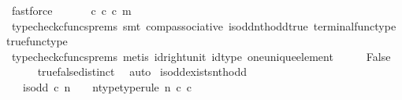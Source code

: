 \begin{isabellebody}
\ fastforce\isanewline
\ \ \isamarkupfalse%
\ \isamarkupfalse%
\ {\isachardoublequoteopen}{\isasymt}\ {\isasymcirc}\isactrlsub c\ {\isasymbeta}\isactrlbsub {\isasymnat}\isactrlsub c\isactrlesub \ {\isasymcirc}\isactrlsub c\ m\ {\isacharequal}{\kern0pt}\ {\isasymf}{\isachardoublequoteclose}\isanewline
\ \ \ \ \isamarkupfalse%
\ {\isacharparenleft}{\kern0pt}typecheck{\isacharunderscore}{\kern0pt}cfuncs{\isacharunderscore}{\kern0pt}prems{\isacharcomma}{\kern0pt}\ smt\ comp{\isacharunderscore}{\kern0pt}associative{}\ is{\isacharunderscore}{\kern0pt}odd{\isacharunderscore}{\kern0pt}nth{\isacharunderscore}{\kern0pt}odd{\isacharunderscore}{\kern0pt}true\ terminal{\isacharunderscore}{\kern0pt}func{\isacharunderscore}{\kern0pt}type\ true{\isacharunderscore}{\kern0pt}func{\isacharunderscore}{\kern0pt}type{\isacharparenright}{\kern0pt}\isanewline
\ \ \isamarkupfalse%
\ \isamarkupfalse%
\ {\isachardoublequoteopen}{\isasymt}\ {\isacharequal}{\kern0pt}\ {\isasymf}{\isachardoublequoteclose}\isanewline
\ \ \ \ \isamarkupfalse%
\ {\isacharparenleft}{\kern0pt}typecheck{\isacharunderscore}{\kern0pt}cfuncs{\isacharunderscore}{\kern0pt}prems{\isacharcomma}{\kern0pt}\ metis\ id{\isacharunderscore}{\kern0pt}right{\isacharunderscore}{\kern0pt}unit{}\ id{\isacharunderscore}{\kern0pt}type\ one{\isacharunderscore}{\kern0pt}unique{\isacharunderscore}{\kern0pt}element{\isacharparenright}{\kern0pt}\isanewline
\ \ \isamarkupfalse%
\ \isamarkupfalse%
\ False\isanewline
\ \ \ \ \isamarkupfalse%
\ true{\isacharunderscore}{\kern0pt}false{\isacharunderscore}{\kern0pt}distinct\ \isamarkupfalse%
\ auto\isanewline
{}\isamarkupfalse%
%
\endisatagproof
{\isafoldproof}%
%
\isadelimproof
\isanewline
%
\endisadelimproof
\isanewline
{}\isamarkupfalse%
\ is{\isacharunderscore}{\kern0pt}odd{\isacharunderscore}{\kern0pt}exists{\isacharunderscore}{\kern0pt}nth{\isacharunderscore}{\kern0pt}odd{\isacharcolon}{\kern0pt}\isanewline
\ \ \ {\isachardoublequoteopen}is{\isacharunderscore}{\kern0pt}odd\ {\isasymcirc}\isactrlsub c\ n\ {\isacharequal}{\kern0pt}\ {\isasymt}{\isachardoublequoteclose}\ \ n{\isacharunderscore}{\kern0pt}type{\isacharbrackleft}{\kern0pt}type{\isacharunderscore}{\kern0pt}rule{\isacharbrackright}{\kern0pt}{\isacharcolon}{\kern0pt}\ {\isachardoublequoteopen}n\ {\isasymin}\isactrlsub c\ {\isasymnat}\isactrlsub c{\isachardoublequoteclose}\isanewline

\end{isabellebody}
